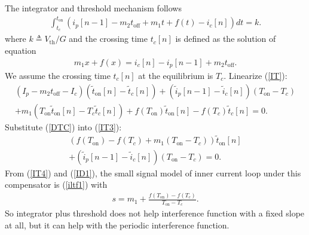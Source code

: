 The integrator and threshold mechanism follows
\begin{align} \label{IT}
\int_{t_c}^{t_{\text{on}}} \left(i_p[n-1] - m_2t_{\text{off}} + m_1 t + f(t) - i_c [n] \right) dt = k.
\end{align}
where $k \triangleq V_{\text{th}}/G$ and the crossing time $t_c[n]$ is defined as the solution of equation
\begin{align} \label{DTC}
 m_1 x + f(x)  = i_c [n] - i_p[n-1] + m_2t_{\text{off}}.
\end{align}
We assume the crossing time $t_c[n]$ at the equilibrium is $T_c$.
Linearize (\ref{IT}):
\begin{align} \label{IT3}
(I_p - m_2t_{\text{off}} - I_c) (\tilde t_{\text{on}}[n] - \tilde t_c[n])  
+(\tilde i_p[n-1] - \tilde i_c [n]) (T_{\text{on}} - T_c)  \nonumber \\
+ m_1 (T_{\text{on}} \tilde t_{\text{on}}[n] - T_c \tilde t_c[n]) +  f(T_{\text{on}}) \tilde t_{\text{on}}[n] - f(T_c) \tilde t_c[n]  = 0.
\end{align}
Substitute (\ref{DTC}) into (\ref{IT3}):
\begin{align} \label{IT4}
(f(T_{\text{on}})-f(T_{c})+m_1(T_{\text{on}}-T_{c}))\tilde{t}_{\text{on}}[n] \nonumber \\
+(\tilde i_p[n-1] - \tilde i_c [n]) (T_{\text{on}} - T_c) =0.
\end{align}
From (\ref{IT4}) and (\ref{ID1}), the small signal model of inner current loop under this compensator is (\ref{iltf1}) with 
\begin{align} \label{S2}
s = m_1 + \frac{f(T_{\text{on}}) - f(T_c)}{T_{\text{on}} - T_c}.
\end{align}
So integrator plus threshold does not help interference function with a fixed slope at all, but it can help with the periodic interference function.

